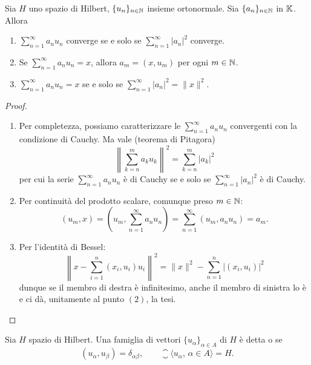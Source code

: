 \begin{lemma}
\label{lemma:hilb_ten}
	Sia $H$ uno spazio di Hilbert, $\{u_n\}_{n \in \mathbb{N}}$ insieme ortonormale. Sia $\{a_n\}_{n \in \mathbb{N}}$ in $\mathbb{K}$.
	Allora
	\begin{enumerate}
		\item $\sum_{n=1}^\infty a_n u_n$ converge se e solo se $\sum_{n=1}^\infty |a_n|^2$ converge.
		\item Se $\sum_{n=1}^\infty a_n u_n = x$, allora $a_m = (x, u_m)$ per ogni $m \in \mathbb{N}$.
		\item $\sum_{n=1}^\infty a_n u_n = x$ se e solo se $\sum_{n=1}^\infty |a_n|^2 = \|x\|^2$.
	\end{enumerate}
\end{lemma}
\begin{proof}
	\leavevmode
	\begin{enumerate}
		\item Per completezza, possiamo caratterizzare le $\sum_{n=1}^\infty a_n u_n$ convergenti con la condizione di Cauchy. Ma vale (teorema di Pitagora)
		\begin{equation*}
			\left\| \sum_{k=n}^m a_k u_k \right\|^2 = \sum_{k=n}^m |a_k|^2
		\end{equation*}
		per cui la serie $\sum_{n=1}^\infty a_n u_n$ è di Cauchy se e solo se $\sum_{n=1}^\infty |a_n|^2$ è di Cauchy.

		\item Per continuità del prodotto scalare, comunque preso $m \in \mathbb{N}$:
		\begin{equation*}
			(u_m, x) = (u_m, {\textstyle \sum_{n=1}^\infty} a_n u_n) = \sum_{n=1}^\infty (u_m, a_n u_n) = a_m.
		\end{equation*}

		\item Per l'identità di Bessel:
		\begin{equation*}
			\left\|x - \sum_{i=1}^n (x_i,u_i)u_i \right\|^2 = \|x\|^2 - \sum_{n=1}^n |(x_i,u_i)|^2
		\end{equation*}
		dunque se il membro di destra è infinitesimo, anche il membro di sinistra lo è  e ci dà, unitamente al punto $(2)$, la tesi.
	\end{enumerate}
\end{proof}

\begin{definition}
	Sia $H$ spazio di Hilbert. Una famiglia di vettori $\{u_\alpha\}_{\alpha \in A}$ di $H$ è detta  o  se
	\begin{equation*}
		(u_\alpha, u_\beta) = \delta_{\alpha\beta}, \qquad \closure{\langle u_\alpha,\, \alpha \in A \rangle} = H.
	\end{equation*}
\end{definition}

